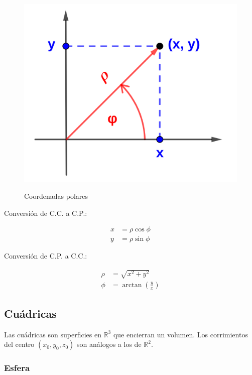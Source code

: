 \documentclass{article}
\renewcommand{\Bbb}{\mathbb}
\begin{document}
\begin{figure}[ht]
\caption{Coordenadas polares}
\includegraphics[scale=1.0]{img/funciones/coord_polares.png}
\centering
\label{fig:polares}
\end{figure}

Conversión de C.C. a C.P.:

\begin{subequations}
\begin{align}
x & = \rho \cos \phi \\
y & = \rho \sin \phi
\end{align}
\end{subequations}

Conversión de C.P. a C.C.:

\begin{subequations}
\begin{align}
\rho & = \sqrt{x^2 + y^2} \\
\phi & = \arctan \left( \frac{y}{x} \right)
\end{align}
\end{subequations}

\subsection{Cuádricas}

Las cuádricas son superficies en $\Bbb R^3$ que encierran un volumen. Los corrimientos del centro $(x_0, y_0, z_0)$ son análogos a los de $\Bbb R^2$.

\subsubsection{Esfera}
\end{document}
